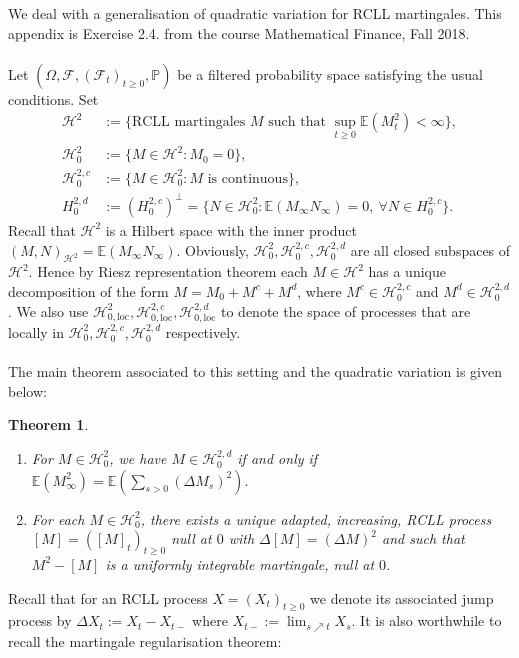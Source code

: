 \documentclass[12pt,a4paper, twoside]{article}
\author{Marco Bertenghi}
\date{}
\newtheorem{thm}{Theorem}[section]
\theoremstyle{definition}
\newcommand{\EE}{\mathbb{E}} %
\newcommand{\PP}{\mathbb{P}} %
\begin{document}
We deal with a generalisation of quadratic variation for RCLL martingales. This appendix is Exercise 2.4. from the course Mathematical Finance, Fall 2018. 
\\\\
Let $(\Omega, \mathcal{F}, ( \mathcal{F}_t)_{t \geq 0}, \PP)$ be a filtered probability space satisfying the usual conditions. Set 
\begin{align*}
\mathcal{H}^2 &:= \{ \text{RCLL martingales $M$ such that } \sup_{t \geq 0} \EE(M_t^2) < \infty\}, \\
\mathcal{H}_0^2 &:= \{ M \in \mathcal{H}^2 : M_0 = 0 \}, \\
\mathcal{H}_0^{2,c} &:= \{ M \in \mathcal{H}_0^2 : M \text{ is continuous}\}, \\
H_0^{2,d}&:= (H_0^{2,c})^\perp = \{ N \in \mathcal{H}_0^2 : \EE(M_\infty N_\infty) =0,  \ \forall N \in H_0^{2, c}\}.
\end{align*}
Recall that $\mathcal{H}^2 $ is a Hilbert space with the inner product $(M,  N)_{\mathcal{H}^2} = \EE(M_\infty N_\infty)$. Obviously,  $\mathcal{H}_0^2, \mathcal{H}_0^{2,c}, \mathcal{H}_0^{2,d}$ are all closed subspaces of $\mathcal{H}^2 $. Hence by Riesz representation theorem each $M \in \mathcal{H}^2 $ has a unique decomposition of the form  $M=M_0 + M^c+M^d$, where $M^c \in \mathcal{H}_0^{2,c}$ and $M^d \in \mathcal{H}_0^{2,d}$. We also use $\mathcal{H}_{0, \text{loc}}^2, \mathcal{H}_{0, \text{loc}}^{2,c}, \mathcal{H}_{0, \text{loc}}^{2,d}$ to denote the space of processes that are locally in $\mathcal{H}_0^2,  \mathcal{H}_0^{2,c}, \mathcal{H}_0^{2,d}$ respectively.  
\\\\
The main theorem associated to this setting and the quadratic variation is given below:
\begin{thm} \label{thmapp1} \
\begin{enumerate}
\item For $M \in \mathcal{H}_0^2$, we have $M \in \mathcal{H}_0^{2,d}$ if and only if $\EE(M_\infty^2 ) = \EE ( \sum_{s > 0} ( \Delta M_s)^2 ).$ 
\item For each $M \in \mathcal{H}_0^2$, there exists a unique adapted, increasing, RCLL process $[M]=([M]_t)_{t \geq 0}$ null at $0$ with $\Delta[M]= (\Delta M)^2$ and such that $M^2- [M]$ is a uniformly integrable martingale, null at $0$.
\end{enumerate}
\end{thm}
Recall that for an RCLL process $X=(X_t)_{t \geq 0}$ we denote its associated jump process by $\Delta X_t := X_t-X_{t-}$ where $X_{t-}:= \lim_{s \nearrow t} X_s$. It is also worthwhile to recall the martingale regularisation theorem:
\end{document}
